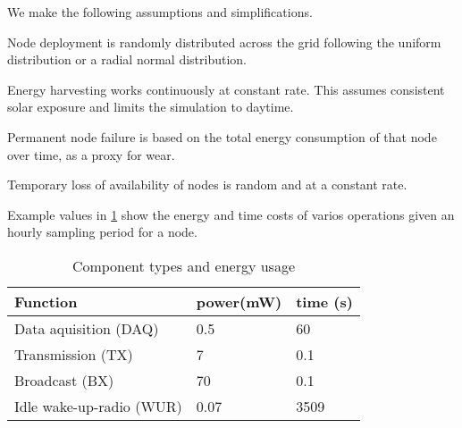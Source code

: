 We make the following assumptions and simplifications.
\begin{itemize}{
		\item Node deployment is randomly distributed across the grid following the uniform distribution or a radial normal distribution.
		\item Energy harvesting works continuously at constant rate. This assumes consistent solar exposure and limits the simulation to daytime.
		\item Permanent node failure is based on the total energy consumption of that node over time, as a proxy for wear.
		\item Temporary loss of availability of nodes is random and at a constant rate.
	}
\end{itemize}




Example values in \ref{table:components_energy_usage} show the energy and time costs of varios operations given an hourly sampling period for a node.


\begin{table}
	\begin{tabular}{p{}p{} p{} }
		\hline
		Function & power(mW) & time (s) \\
		\hline
		Data aquisition (DAQ) & 0.5 & 60 \\
		Transmission (TX) & 7 & 0.1 \\
		Broadcast (BX) & 70 & 0.1 \\
		Idle wake-up-radio (WUR) & 0.07 & 3509 \\
	\end{tabular}
	\caption{Component types and energy usage}
	\label{table:components_energy_usage}
\end{table}

